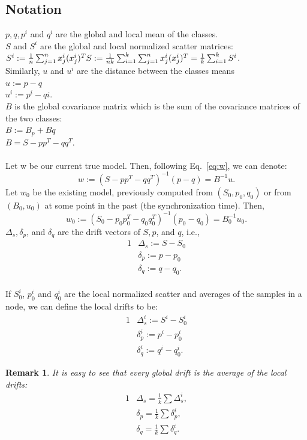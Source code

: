 \documentclass[11pt,twocolumn,varwidth=true,a4paper,fleqn]{article}
\newtheorem{remark}{Remark}
\begin{document}
\subsection{Notation}
$p,q,p^i$ and $q^i$  are the global and local mean of the classes.
\\$S$ and $S^i$  are the global and local normalized scatter matrices:
\\$S^i := \frac{1}{n}\sum_{j=1}^{n}x^i_j(x^i_j)^T
\\S := \frac{1}{nk}
\sum_{i=1}^k\sum_{j=1}^nx^i_j(x^i_j)^T=\frac{1}{k}\sum_{i=1}^kS^i$.
\\Similarly, $u$ and $u^i$ are the distance between the classes means
\\$u:=p - q$
\\$u^i:=p^i - qi$.
\\ $B$ is the global covariance matrix which is the sum of the covariance
matrices of the two classes:
\\$B:=B_p+Bq$
\\$B=S - pp^T - qq^T$.
\\\\Let w be our current true model. Then, following Eq.~\ref{eq:w}, we can
denote:
\begin{equation*}
w:=(S - pp^T - qq^T)^{-1}(p-q)=B^{-1}u.
\end{equation*}
Let $w_0$ be the existing model, previously computed from $(S_0, p_0, q_0)$
or from $(B_0,u_0)$ at some point in the past (the synchronization time).
Then,
\begin{equation*} 
w_0:=(S_0 - p_0p_0^T - q_0q_0^T)^{-1}(p_0-q_0)=B_0^{-1}u_0.
\end{equation*}
$\Delta_s, \delta_p$, and $\delta_q$ are the drift vectors of $S, p$, and $q$,
i.e.,
\begin{alignat*}{1}
& \Delta_s:= S - S_0 \\
& \delta_p:= p - p_0 \\
& \delta_q := q - q_0.
\end{alignat*}
\\If $S_0^i$, $p_0^i$ and $q_0^i$ are the local normalized scatter and averages
of the samples in a node, we can define the local drifts to be:
\begin{alignat*}{1}
& \Delta_s^i:= S^i - S_0^i
\\ & \delta_p^i:= p^i - p_0^i
\\ & \delta_q^i:= q^i - q_0^i.
\end{alignat*}
\begin{remark} \label{average}
It is easy to see that every global drift is the average of the local drifts:
\begin{alignat*}{1}
& \Delta_s = \frac{1}{k} \sum \Delta_s^i, \\
& \delta_p = \frac{1}{k} \sum \delta_p^i, \\
& \delta_q = \frac{1}{k} \sum \delta_q^i.
\end{alignat*}

\end{remark}
\end{document}
